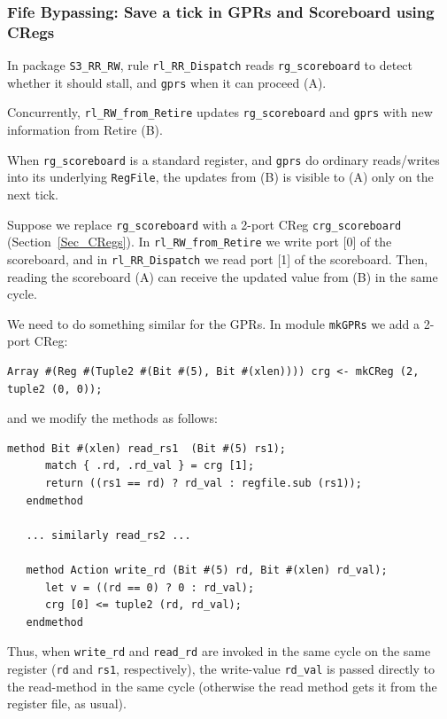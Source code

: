 
\subsubsection{Fife Bypassing: Save a tick in GPRs and Scoreboard using CRegs}

In package \verb|S3_RR_RW|, rule \verb|rl_RR_Dispatch| reads
\verb|rg_scoreboard| to detect whether it should stall, and
\verb|gprs| when it can proceed (A).

Concurrently, \verb|rl_RW_from_Retire| updates \verb|rg_scoreboard|
and \verb|gprs| with new information from Retire (B).

When \verb|rg_scoreboard| is a standard register, and \verb|gprs| do
ordinary reads/writes into its underlying \verb|RegFile|, the updates
from (B) is visible to (A) only on the next tick.

Suppose we replace \verb|rg_scoreboard| with a 2-port CReg
\verb|crg_scoreboard| (Section~\ref{Sec_CRegs}). In
\verb|rl_RW_from_Retire| we write port [0] of the scoreboard, and in
\verb|rl_RR_Dispatch| we read port [1] of the scoreboard.  Then,
reading the scoreboard (A) can receive the updated value from (B) in
the same cycle.

We need to do something similar for the GPRs.  In module \verb|mkGPRs|
we add a 2-port CReg:

{\small
\begin{Verbatim}[frame=single, label=src\_Common/GPRs.bsv]
 Array #(Reg #(Tuple2 #(Bit #(5), Bit #(xlen)))) crg <- mkCReg (2, tuple2 (0, 0));
\end{Verbatim}
}

and we modify the methods as follows:

{\small
\begin{Verbatim}[frame=single, label=src\_Common/GPRs.bsv]
   method Bit #(xlen) read_rs1  (Bit #(5) rs1);
      match { .rd, .rd_val } = crg [1];
      return ((rs1 == rd) ? rd_val : regfile.sub (rs1));
   endmethod

   ... similarly read_rs2 ...

   method Action write_rd (Bit #(5) rd, Bit #(xlen) rd_val);
      let v = ((rd == 0) ? 0 : rd_val);
      crg [0] <= tuple2 (rd, rd_val);
   endmethod
\end{Verbatim}
}

Thus, when \verb|write_rd| and \verb|read_rd| are invoked in the same
cycle on the same register (\verb|rd| and \verb|rs1|, respectively),
the write-value \verb|rd_val| is passed directly to the read-method in
the same cycle (otherwise the read method gets it from the register
file, as usual).

